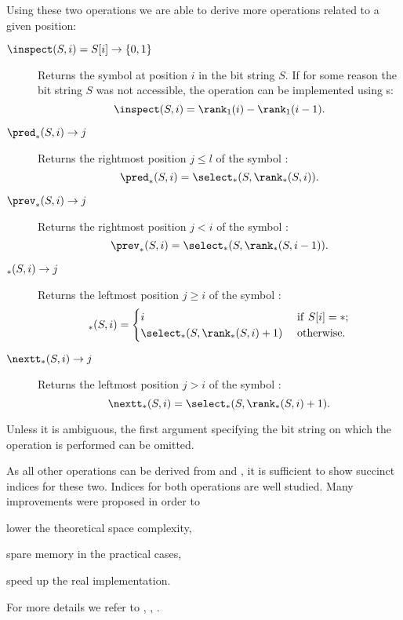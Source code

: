 Using these two operations we are able to derive more operations related to a given position:
\begin{description}
	\item[$\inspect(S, i) = S[i\char93 \rightarrow \{0, 1\}$]
	Returns the symbol at position $i$ in the bit string $S$.
	If for some reason the bit string $S$ was not accessible, the operation can be implemented using \rank{}s:
	$$ \inspect(S, i) = \rank_1(i) - \rank_1(i - 1). $$

	\item[$\pred_{\ph}(S, i) \rightarrow j$]
	Returns the rightmost position $j \le l$ of the symbol \ph{}:
	$$ \pred_{\ph}(S, i) = \select_{\ph}(S, \rank_{\ph}(S, i)). $$
	
	\item[$\prev_{\ph}(S, i) \rightarrow j$]
	Returns the rightmost position $j < i$ of the symbol \ph{}:
	$$ \prev_{\ph}(S, i) = \select_{\ph}(S, \rank_{\ph}(S, i - 1)). $$

	\item[$\succ_{\ph}(S, i) \rightarrow j$]
	Returns the leftmost position $j \ge i$ of the symbol \ph{}:
	$$ \succ_{\ph}(S, i) = \begin{cases}
		i & \textif S[i] = \ph; \\
		\select_{\ph}(S, \rank_{\ph}(S, i) + 1) & \textotherwise.
	\end{cases} $$

	\item[$\nextt_{\ph}(S, i) \rightarrow j$]
	Returns the leftmost position $j > i$ of the symbol \ph{}:
	$$ \nextt_{\ph}(S, i) = \select_{\ph}(S, \rank_{\ph}(S, i) + 1).$$
\end{description}

Unless it is ambiguous, the first argument specifying the bit string on which the operation is performed can be omitted.

\bigbreak

As all other operations can be derived from \rank{} and \select{}, it is sufficient to show succinct indices for these two.
Indices for both operations are well studied.
Many improvements were proposed in order to
\begin{iteminline}
	\item lower the theoretical space complexity,
	\item spare memory in the practical cases,
	\item speed up the real implementation.
\end{iteminline}
For more details we refer to \cite{gonzalez2005practical}, \cite{kim2005efficient}, \cite{makinen2007rank}.

